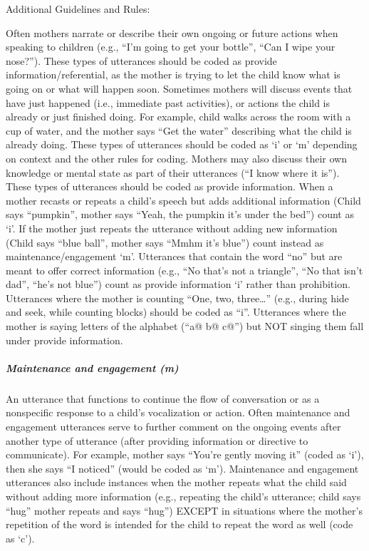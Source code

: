 \documentclass[
  12pt,
]{book}
\begin{document}
Additional Guidelines and Rules:

Often mothers narrate or describe their own ongoing or future actions when speaking to children (e.g., ``I'm going to get your bottle'', ``Can I wipe your nose?''). These types of utterances should be coded as provide information/referential, as the mother is trying to let the child know what is going on or what will happen soon.
Sometimes mothers will discuss events that have just happened (i.e., immediate past activities), or actions the child is already or just finished doing. For example, child walks across the room with a cup of water, and the mother says ``Get the water'' describing what the child is already doing. These types of utterances should be coded as `i' or `m' depending on context and the other rules for coding.
Mothers may also discuss their own knowledge or mental state as part of their utterances (``I know where it is''). These types of utterances should be coded as provide information.
When a mother recasts or repeats a child's speech but adds additional information (Child says ``pumpkin'', mother says ``Yeah, the pumpkin it's under the bed'') count as `i'. If the mother just repeats the utterance without adding new information (Child says ``blue ball'', mother says ``Mmhm it's blue'') count instead as maintenance/engagement `m'.
Utterances that contain the word ``no'' but are meant to offer correct information (e.g., ``No that's not a triangle'', ``No that isn't dad'', ``he's not blue'') count as provide information `i' rather than prohibition.
Utterances where the mother is counting ``One, two, three\ldots{}'' (e.g., during hide and seek, while counting blocks) should be coded as ``i''. Utterances where the mother is saying letters of the alphabet (``a@ b@ c@'') but NOT singing them fall under provide information.

\hypertarget{maintenance_engagement}{%
\subparagraph*{Maintenance and engagement (m)}\label{maintenance_engagement}}

An utterance that functions to continue the flow of conversation or as a nonspecific response to a child's vocalization or action. Often maintenance and engagement utterances serve to further comment on the ongoing events after another type of utterance (after providing information or directive to communicate). For example, mother says ``You're gently moving it'' (coded as `i'), then she says ``I noticed'' (would be coded as `m'). Maintenance and engagement utterances also include instances when the mother repeats what the child said without adding more information (e.g., repeating the child's utterance; child says ``hug'' mother repeats and says ``hug'') EXCEPT in situations where the mother's repetition of the word is intended for the child to repeat the word as well (code as `c').
\end{document}
